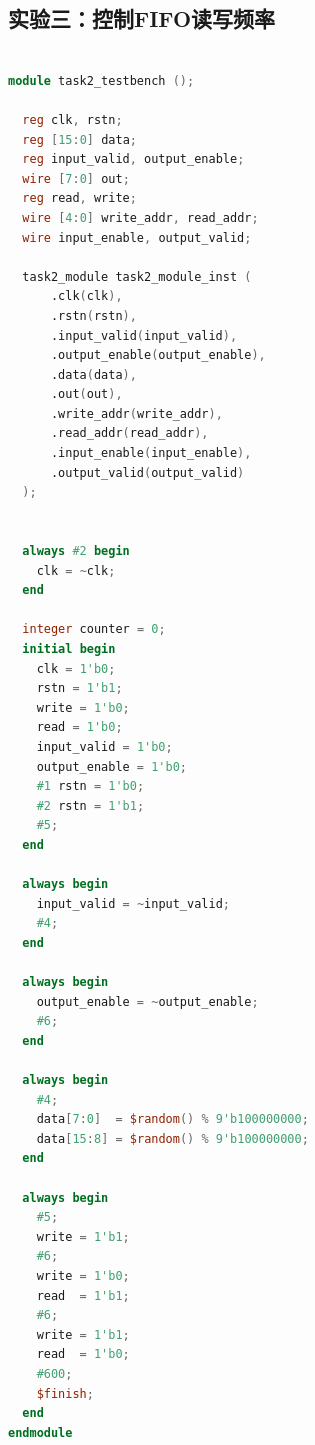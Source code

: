 \documentclass[zihao=5, UTF8]{article}
\theoremstyle{MyLineTheoremStyle} %
\theoremstyle{MyBlockTheoremStyle} %
\theoremstyle{MySubsubsectionStyle} %
\begin{document}
\subsection{实验三：控制FIFO读写频率}
\begin{lstlisting}[language=Verilog]

module task2_testbench ();

  reg clk, rstn;
  reg [15:0] data;
  reg input_valid, output_enable;
  wire [7:0] out;
  reg read, write;
  wire [4:0] write_addr, read_addr;
  wire input_enable, output_valid;

  task2_module task2_module_inst (
      .clk(clk),
      .rstn(rstn),
      .input_valid(input_valid),
      .output_enable(output_enable),
      .data(data),
      .out(out),
      .write_addr(write_addr),
      .read_addr(read_addr),
      .input_enable(input_enable),
      .output_valid(output_valid)
  );


  always #2 begin
    clk = ~clk;
  end

  integer counter = 0;
  initial begin
    clk = 1'b0;
    rstn = 1'b1;
    write = 1'b0;
    read = 1'b0;
    input_valid = 1'b0;
    output_enable = 1'b0;
    #1 rstn = 1'b0;
    #2 rstn = 1'b1;
    #5;
  end

  always begin
    input_valid = ~input_valid;
    #4;
  end

  always begin
    output_enable = ~output_enable;
    #6;
  end

  always begin
    #4;
    data[7:0]  = $random() % 9'b100000000;
    data[15:8] = $random() % 9'b100000000;
  end

  always begin
    #5;
    write = 1'b1;
    #6;
    write = 1'b0;
    read  = 1'b1;
    #6;
    write = 1'b1;
    read  = 1'b0;
    #600;
    $finish;
  end
endmodule

\end{lstlisting}
\end{document}
